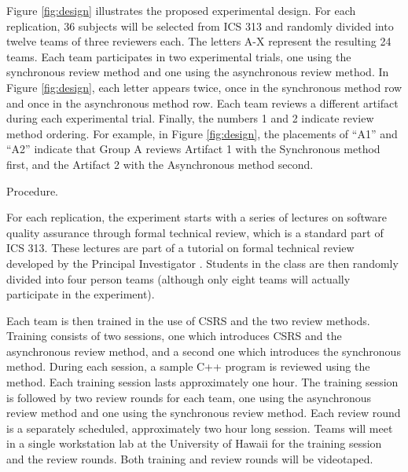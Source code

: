 

Figure \ref{fig:design} illustrates the proposed experimental design.  For
each replication, 36 subjects will be selected from ICS 313 and
randomly divided into twelve teams of three reviewers each. The letters A-X
represent the resulting 24 teams.  Each team participates in two
experimental trials, one using the synchronous review method and one using
the asynchronous review method.  In Figure \ref{fig:design}, each letter
appears twice, once in the synchronous method row and once in the
asynchronous method row.  Each team reviews a different artifact during
each experimental trial.  Finally, the numbers 1 and 2 indicate review
method ordering.  For example, in Figure \ref{fig:design}, the placements
of ``A1'' and ``A2'' indicate that Group A reviews Artifact 1 with the
Synchronous method first, and the Artifact 2 with the Asynchronous method
second.  

\par{Procedure.}

For each replication, the experiment starts with a series of lectures on
software quality assurance through formal technical review, which is a
standard part of ICS 313.  These lectures are part of a tutorial on
formal technical review developed by the Principal Investigator
\cite{Johnson95}.  Students in the class are then randomly divided into
four person teams (although only eight teams will actually participate in
the experiment).

Each team is then trained in the use of CSRS and the two review methods.
Training consists of two sessions, one which introduces CSRS and the
asynchronous review method, and a second one which introduces the
synchronous method.  During each session, a sample C++ program is reviewed
using the method.  Each training session lasts approximately one hour.  The
training session is followed by two review rounds for each team, one using
the asynchronous review method and one using the synchronous review
method.  Each review round is a separately scheduled, approximately two
hour long session. Teams will meet in a single workstation lab at the University of
Hawaii for the training session and the review rounds.  Both training and
review rounds will be videotaped. 

